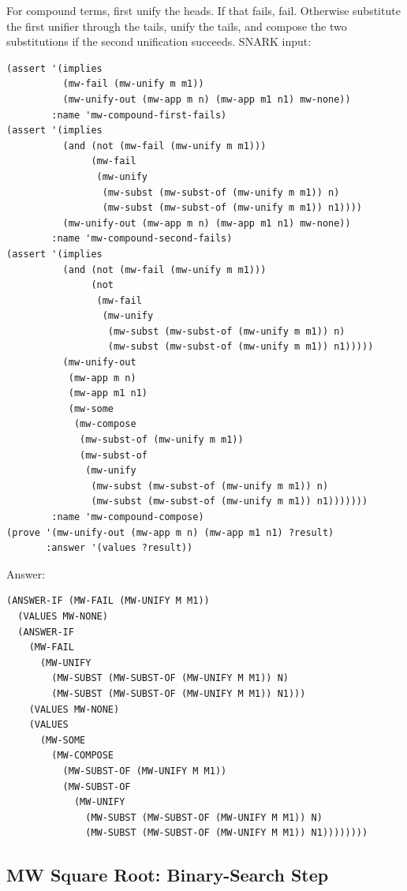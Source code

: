 \documentclass[runningheads]{llncs}
\begin{document}
For compound terms, first unify the heads.  If that fails, fail.  Otherwise
substitute the first unifier through the tails, unify the tails, and compose
the two substitutions if the second unification succeeds.
SNARK input:
\begin{lstlisting}
(assert '(implies
          (mw-fail (mw-unify m m1))
          (mw-unify-out (mw-app m n) (mw-app m1 n1) mw-none))
        :name 'mw-compound-first-fails)
(assert '(implies
          (and (not (mw-fail (mw-unify m m1)))
               (mw-fail
                (mw-unify
                 (mw-subst (mw-subst-of (mw-unify m m1)) n)
                 (mw-subst (mw-subst-of (mw-unify m m1)) n1))))
          (mw-unify-out (mw-app m n) (mw-app m1 n1) mw-none))
        :name 'mw-compound-second-fails)
(assert '(implies
          (and (not (mw-fail (mw-unify m m1)))
               (not
                (mw-fail
                 (mw-unify
                  (mw-subst (mw-subst-of (mw-unify m m1)) n)
                  (mw-subst (mw-subst-of (mw-unify m m1)) n1)))))
          (mw-unify-out
           (mw-app m n)
           (mw-app m1 n1)
           (mw-some
            (mw-compose
             (mw-subst-of (mw-unify m m1))
             (mw-subst-of
              (mw-unify
               (mw-subst (mw-subst-of (mw-unify m m1)) n)
               (mw-subst (mw-subst-of (mw-unify m m1)) n1)))))))
        :name 'mw-compound-compose)
(prove '(mw-unify-out (mw-app m n) (mw-app m1 n1) ?result)
       :answer '(values ?result))
\end{lstlisting}
Answer:
\begin{lstlisting}
(ANSWER-IF (MW-FAIL (MW-UNIFY M M1))
  (VALUES MW-NONE)
  (ANSWER-IF
    (MW-FAIL
      (MW-UNIFY
        (MW-SUBST (MW-SUBST-OF (MW-UNIFY M M1)) N)
        (MW-SUBST (MW-SUBST-OF (MW-UNIFY M M1)) N1)))
    (VALUES MW-NONE)
    (VALUES
      (MW-SOME
        (MW-COMPOSE
          (MW-SUBST-OF (MW-UNIFY M M1))
          (MW-SUBST-OF
            (MW-UNIFY
              (MW-SUBST (MW-SUBST-OF (MW-UNIFY M M1)) N)
              (MW-SUBST (MW-SUBST-OF (MW-UNIFY M M1)) N1))))))))
\end{lstlisting}

\subsection{MW Square Root: Binary-Search Step}
\end{document}
